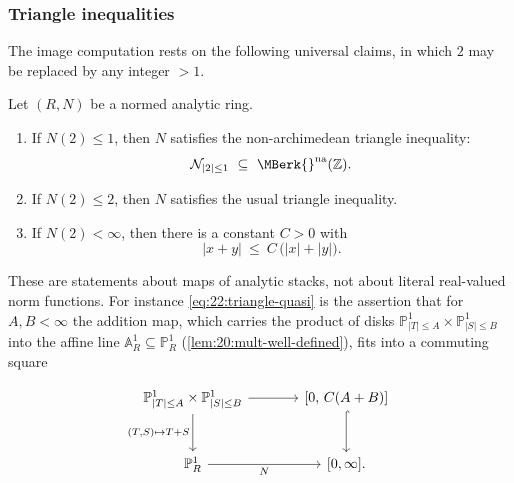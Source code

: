 \subsubsection*{Triangle inequalities}

The image computation rests on the following universal claims, in which
$2$ may be replaced by any integer $>1$.

\begin{proposition}
\label{prop:22:triangle}
Let $(R,N)$ be a normed analytic ring.
\begin{enumerate}
\item If $N(2)\le1$, then $N$ satisfies the non-archimedean triangle inequality:
\begin{equation}
\label{eq:22:triangle-na}
\mathcal N_{|2|\le1}\ \subseteq\ \MBerk{}^{\mathrm{na}}(\mathbb Z).
\end{equation}
\item If $N(2)\le2$, then $N$ satisfies the usual triangle inequality.
\item If $N(2)<\infty$, then there is a constant $C>0$ with
\begin{equation}
\label{eq:22:triangle-quasi}
|x+y|\ \le\ C\,\bigl(|x|+|y|\bigr).
\end{equation}
\end{enumerate}
\end{proposition}

These are statements about maps of analytic stacks, not about literal
real-valued norm functions. For instance \eqref{eq:22:triangle-quasi} is the
assertion that for $A,B<\infty$ the addition map, which carries the product of
disks $\mathbb P^1_{|T|\le A}\times\mathbb P^1_{|S|\le B}$ into the affine line
$\mathbb A^1_R\subseteq\mathbb P^1_R$ (\cref{lem:20:mult-well-defined}), fits
into a commuting square

\begin{equation*}
\begin{tikzcd}[column sep=large, row sep=large]
\mathbb P^1_{|T|\le A}\times\mathbb P^1_{|S|\le B}
  \arrow[r] \arrow[d, "{(T,S)\mapsto T+S}"']
& {[0,\,C(A+B)]} \arrow[d, hook] \\
\mathbb P^1_R \arrow[r, "N"'] & {[0,\infty] .}
\end{tikzcd}
\end{equation*}

